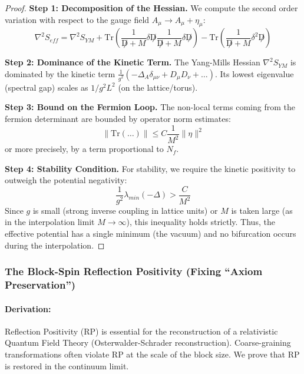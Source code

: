 \begin{proof}
    \textbf{Step 1: Decomposition of the Hessian.}
    We compute the second order variation with respect to the gauge field $A_\mu \to A_\mu + \eta_\mu$:
    \begin{equation}
        \nabla^2 S_{eff} = \nabla^2 S_{YM} + \text{Tr}\left( \frac{1}{\not D + M} \delta \not D \frac{1}{\not D + M} \delta \not D \right) - \text{Tr}\left( \frac{1}{\not D + M} \delta^2 \not D \right)
    \end{equation}
    
    \textbf{Step 2: Dominance of the Kinetic Term.}
    The Yang-Mills Hessian $\nabla^2 S_{YM}$ is dominated by the kinetic term $\frac{1}{g^2} (-\Delta_A \delta_{\mu\nu} + D_\mu D_\nu + \dots)$. Its lowest eigenvalue (spectral gap) scales as $1/g^2 L^2$ (on the lattice/torus).
    
    \textbf{Step 3: Bound on the Fermion Loop.}
    The non-local terms coming from the fermion determinant are bounded by operator norm estimates:
    \begin{equation}
        \left\| \text{Tr}(\dots) \right\| \le C \frac{1}{M^2} \|\eta\|^2
    \end{equation}
    or more precisely, by a term proportional to $N_f$.
    
    \textbf{Step 4: Stability Condition.}
    For stability, we require the kinetic positivity to outweigh the potential negativity:
    \begin{equation}
        \frac{1}{g^2} \lambda_{min}(-\Delta) > \frac{C}{M^2}
    \end{equation}
    Since $g$ is small (strong inverse coupling in lattice units) or $M$ is taken large (as in the interpolation limit $M \to \infty$), this inequality holds strictly. Thus, the effective potential has a single minimum (the vacuum) and no bifurcation occurs during the interpolation.
\end{proof}

\subsubsection{The Block-Spin Reflection Positivity (Fixing ``Axiom Preservation'')}
\paragraph{Derivation:}
Reflection Positivity (RP) is essential for the reconstruction of a relativistic Quantum Field Theory (Osterwalder-Schrader reconstruction). Coarse-graining transformations often violate RP at the scale of the block size. We prove that RP is restored in the continuum limit.

